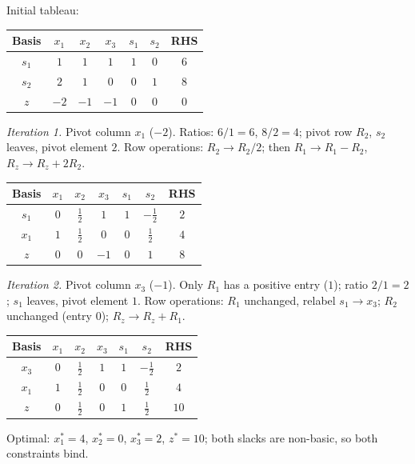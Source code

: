 \begin{solutions}
  \item Initial tableau:
        \begin{center}
        \begin{tabular}{c|ccccc|c}
        Basis & $x_1$ & $x_2$ & $x_3$ & $s_1$ & $s_2$ & RHS\\
        \hline
        $s_1$ & $1$ & $1$ & $1$ & $1$ & $0$ & $6$\\
        $s_2$ & $2$ & $1$ & $0$ & $0$ & $1$ & $8$\\
        \hline
        $z$ & $-2$ & $-1$ & $-1$ & $0$ & $0$ & $0$\\
        \end{tabular}
        \end{center}
        \emph{Iteration 1.} Pivot column $x_1$ ($-2$). Ratios: $6/1=6$,
        $8/2=4$; pivot row $R_2$, $s_2$ leaves, pivot element $2$. Row
        operations: $R_2\to R_2/2$; then $R_1\to R_1-R_2$,
        $R_z\to R_z+2R_2$.
        \begin{center}
        \begin{tabular}{c|ccccc|c}
        Basis & $x_1$ & $x_2$ & $x_3$ & $s_1$ & $s_2$ & RHS\\
        \hline
        $s_1$ & $0$ & $\tfrac{1}{2}$ & $1$ & $1$ & $-\tfrac{1}{2}$ & $2$\\
        $x_1$ & $1$ & $\tfrac{1}{2}$ & $0$ & $0$ & $\tfrac{1}{2}$ & $4$\\
        \hline
        $z$ & $0$ & $0$ & $-1$ & $0$ & $1$ & $8$\\
        \end{tabular}
        \end{center}
        \emph{Iteration 2.} Pivot column $x_3$ ($-1$). Only $R_1$ has a
        positive entry ($1$); ratio $2/1=2$; $s_1$ leaves, pivot element
        $1$. Row operations: $R_1$ unchanged, relabel $s_1\to x_3$;
        $R_2$ unchanged (entry $0$); $R_z\to R_z+R_1$.
        \begin{center}
        \begin{tabular}{c|ccccc|c}
        Basis & $x_1$ & $x_2$ & $x_3$ & $s_1$ & $s_2$ & RHS\\
        \hline
        $x_3$ & $0$ & $\tfrac{1}{2}$ & $1$ & $1$ & $-\tfrac{1}{2}$ & $2$\\
        $x_1$ & $1$ & $\tfrac{1}{2}$ & $0$ & $0$ & $\tfrac{1}{2}$ & $4$\\
        \hline
        $z$ & $0$ & $\tfrac{1}{2}$ & $0$ & $1$ & $\tfrac{1}{2}$ & $10$\\
        \end{tabular}
        \end{center}
        Optimal: $x_1^{*}=4$, $x_2^{*}=0$, $x_3^{*}=2$, $z^{*}=10$;
        both slacks are non-basic, so both constraints bind.


\end{solutions}
